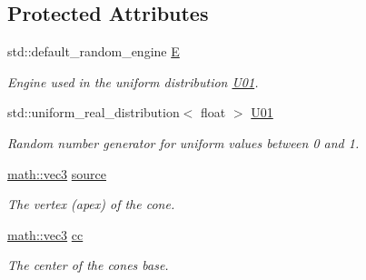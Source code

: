 \subsection*{Protected Attributes}
\begin{DoxyCompactItemize}
\item 
\mbox{\label{classphysim_1_1init_1_1hose_a8ad99d10b4f1d69100cd421f7052acae}} 
std\+::default\+\_\+random\+\_\+engine \hyperlink{classphysim_1_1init_1_1hose_a8ad99d10b4f1d69100cd421f7052acae}{E}
\begin{DoxyCompactList}\small\item\em Engine used in the uniform distribution \hyperlink{classphysim_1_1init_1_1hose_ab2c5d6bc99e0493acb3300725a83e923}{U01}. \end{DoxyCompactList}\item 
\mbox{\label{classphysim_1_1init_1_1hose_ab2c5d6bc99e0493acb3300725a83e923}} 
std\+::uniform\+\_\+real\+\_\+distribution$<$ float $>$ \hyperlink{classphysim_1_1init_1_1hose_ab2c5d6bc99e0493acb3300725a83e923}{U01}
\begin{DoxyCompactList}\small\item\em Random number generator for uniform values between 0 and 1. \end{DoxyCompactList}\item 
\mbox{\label{classphysim_1_1init_1_1hose_ad0714340c9f5459645dfdc0f51fd0b46}} 
\hyperlink{structphysim_1_1math_1_1vec3}{math\+::vec3} \hyperlink{classphysim_1_1init_1_1hose_ad0714340c9f5459645dfdc0f51fd0b46}{source}
\begin{DoxyCompactList}\small\item\em The vertex (apex) of the cone. \end{DoxyCompactList}\item 
\mbox{\label{classphysim_1_1init_1_1hose_ade0e7778aea40fc3d7f471bc999ad541}} 
\hyperlink{structphysim_1_1math_1_1vec3}{math\+::vec3} \hyperlink{classphysim_1_1init_1_1hose_ade0e7778aea40fc3d7f471bc999ad541}{cc}
\begin{DoxyCompactList}\small\item\em The center of the cone\textquotesingle{}s base. \end{DoxyCompactList}\item 

\end{DoxyCompactItemize}
